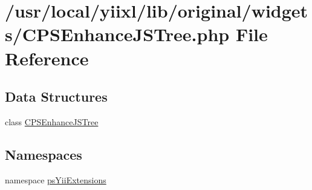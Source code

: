 \hypertarget{CPSEnhanceJSTree_8php}{
\section{/usr/local/yiixl/lib/original/widgets/CPSEnhanceJSTree.php File Reference}
\label{CPSEnhanceJSTree_8php}
}
\subsection*{Data Structures}
\begin{DoxyCompactItemize}
\item 
class \hyperlink{classCPSEnhanceJSTree}{CPSEnhanceJSTree}
\end{DoxyCompactItemize}
\subsection*{Namespaces}
\begin{DoxyCompactItemize}
\item 
namespace \hyperlink{namespacepsYiiExtensions}{psYiiExtensions}
\end{DoxyCompactItemize}
